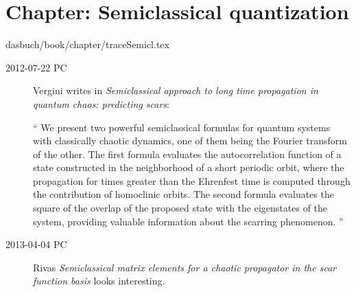 %

\section{Chapter: Semiclassical quantization}
\label{c-traceSemicl}\noindent dasbuch/book/chapter/traceSemicl.tex

\begin{description}
\item[2012-07-22 PC]
Vergini writes in {\em Semiclassical approach to long time
propagation in quantum chaos: predicting scars}:

``
We present two powerful semiclassical formulas for quantum systems with
classically chaotic dynamics, one of them being the Fourier transform of
the other. The first formula evaluates the autocorrelation function of a
state constructed in the neighborhood of a short periodic orbit, where
the propagation for times greater than the Ehrenfest time is computed
through the contribution of homoclinic orbits. The second formula
evaluates the square of the overlap of the proposed state with the
eigenstates of the system, providing valuable information about the
scarring phenomenon.
''

\item[2013-04-04 PC] Rivas
{\em Semiclassical matrix elements for a chaotic propagator in
         the scar function basis} looks interesting.

\end{description}

